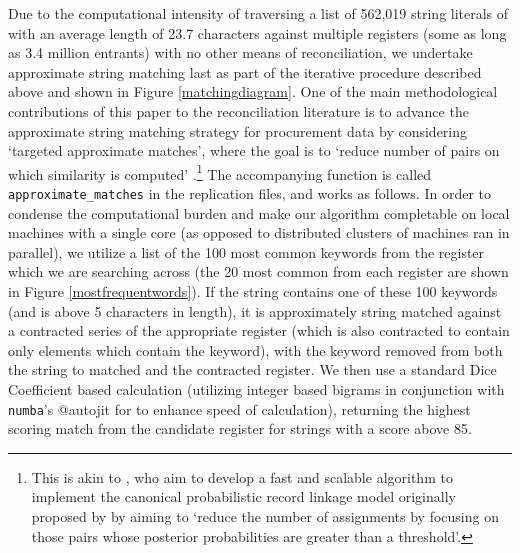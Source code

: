 \documentclass[12pt]{article}
\begin{document}
Due to the computational intensity of traversing a list of 562,019 string literals of with an average length of 23.7 characters against multiple registers (some as long as 3.4 million entrants) with no other means of reconciliation, we undertake approximate string matching last as part of the iterative procedure described above and shown in Figure \ref{matchingdiagram}. One of the main methodological contributions of this paper to the reconciliation literature is to advance the approximate string matching strategy for procurement data by considering `targeted approximate matches', where the goal is to `reduce number of pairs on which similarity is computed' \citep{Koudas:2006:RLS:1142473.1142599}.\footnote{This is akin to \cite{imai2017}, who aim to develop a fast and scalable algorithm to implement  the canonical probabilistic record linkage model originally proposed by \cite{doi:10.1080/01621459.1969.10501049} by aiming to `reduce the number of assignments by focusing on those pairs whose posterior probabilities are greater than a threshold'.} The accompanying function is called \texttt{approximate\_matches} in the replication files, and works as follows. In order to condense the computational burden and make our algorithm completable on local machines with a single core (as opposed to distributed clusters of machines ran in parallel), we utilize a list of the 100 most common keywords from the register which we are searching across (the 20 most common from each register are shown in Figure \ref{mostfrequentwords}). If the string contains one of these 100 keywords (and is above 5 characters in length), it is approximately string matched against a contracted series of the appropriate register (which is also contracted to contain only elements which contain the keyword), with the keyword removed from both the string to matched and the contracted register. We then use a standard Dice Coefficient based calculation (utilizing integer based bigrams in conjunction with \texttt{numba}'s @autojit for to enhance speed of calculation), returning the highest scoring match from the candidate register for strings with a score above 85.
\end{document}
